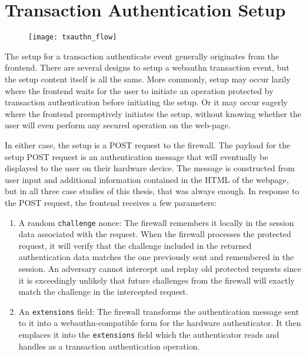 \section{Transaction Authentication Setup}\label{Sec:TransactionAuthenticationSetup}

\begin{figure}[h]
  \centering
  \texttt{[image: txauthn\_flow]}
\end{figure}


The setup for a transaction authenticate event generally originates from the frontend. There are several designs to setup a webauthn transaction event, but the setup content itself is all the same. More commonly, setup may occur lazily where the frontend waits for the user to initiate an operation protected by transaction authentication before initiating the setup. Or it may occur eagerly where the frontend preemptively initiates the setup, without knowing whether the user will even perform any secured operation on the web-page. 

In either case, the setup is a POST request to the firewall. The payload for the setup POST request is an authentication message that will eventually be displayed to the user on their hardware device. The message is constructed from user input and additional information contained in the HTML of the webpage, but in all three case studies of this thesis, that was always enough. In response to the POST request, the frontend receives a few parameters:


\begin{enumerate}[nosep]
\item A random \lstinline{challenge} nonce: The firewall remembers it locally in the session data associated with the request. When the firewall processes the protected request, it will verify that the challenge included in the returned authentication data matches the one previously sent and remembered in the session. An adversary cannot intercept and replay old protected requests since it is exceedingly unlikely that future challenges from the firewall will exactly match the challenge in the intercepted request.

\item An \lstinline{extensions} field: The firewall transforms the authentication message sent to it into a webauthn-compatible form for the hardware authenticator. It then emplaces it into the \lstinline{extensions} field which the authenticator reads and handles as a transaction authentication operation.

\end{enumerate}

